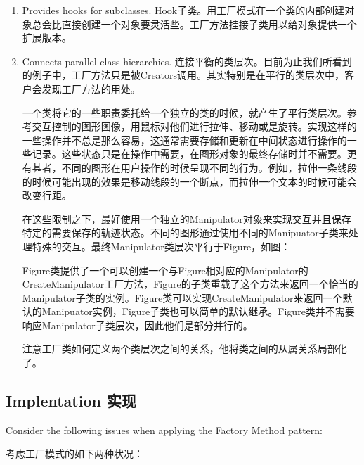 \begin{enumerate}

\item Provides hooks for subclasses.
      Hook子类。用工厂模式在一个类的内部创建对象总会比直接创建一个对象要灵活些。工厂方法挂接子类用以给对象提供一个扩展版本。

\item Connects parallel class hierarchies.
	  连接平衡的类层次。目前为止我们所看到的例子中，工厂方法只是被Creators调用。其实特别是在平行的类层次中，客户会发现工厂方法的用处。

	  一个类将它的一些职责委托给一个独立的类的时候，就产生了平行类层次。参考交互控制的图形图像，用鼠标对他们进行拉伸、移动或是旋转。实现这样的一些操作并不总是那么容易，这通常需要存储和更新在中间状态进行操作的一些记录。这些状态只是在操作中需要，在图形对象的最终存储时并不需要。更有甚者，不同的图形在用户操作的时候呈现不同的行为。例如，拉伸一条线段的时候可能出现的效果是移动线段的一个断点，而拉伸一个文本的时候可能会改变行距。

	  在这些限制之下，最好使用一个独立的Manipulator对象来实现交互并且保存特定的需要保存的轨迹状态。不同的图形通过使用不同的Manipuator子类来处理特殊的交互。最终Manipulator类层次平行于Figure，如图：


	  Figure类提供了一个可以创建一个与Figure相对应的Manipulator的CreateManipulator工厂方法，Figure的子类重载了这个方法来返回一个恰当的Manipulator子类的实例。Figure类可以实现CreateManipulator来返回一个默认的Manipuator实例，Figure子类也可以简单的默认继承。Figure类并不需要响应Manipulator子类层次，因此他们是部分并行的。

	  注意工厂类如何定义两个类层次之间的关系，他将类之间的从属关系局部化了。

\end{enumerate}

\subsection{Implentation 实现}

Consider the following issues when applying the Factory Method pattern:

考虑工厂模式的如下两种状况：

